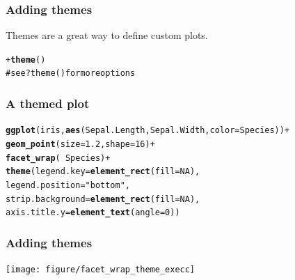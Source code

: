 \documentclass{beamer}\usepackage{graphicx, color}
\makeatletter
\newcommand{\hlfunctioncall}[1]{\textcolor[rgb]{0.501960784313725,0,0.329411764705882}{\textbf{#1}}}%
\newcommand{\hlstring}[1]{\textcolor[rgb]{0.6,0.6,1}{#1}}%
\newcommand{\hlcomment}[1]{\textcolor[rgb]{0.180392156862745,0.6,0.341176470588235}{#1}}%
\newenvironment{kframe}{%
 \def\at@end@of@kframe{}%
 \ifinner\ifhmode%
  \def\at@end@of@kframe{\end{minipage}}%
  \begin{minipage}{\columnwidth}%
 \fi\fi%
 \def\FrameCommand##1{\hskip\@totalleftmargin \hskip-\fboxsep
 \colorbox{shadecolor}{##1}\hskip-\fboxsep
     \hskip-\linewidth \hskip-\@totalleftmargin \hskip\columnwidth}%
 \MakeFramed {\advance\hsize-\width
   \@totalleftmargin\z@ \linewidth\hsize
   \@setminipage}}%
 {\par\unskip\endMakeFramed%
 \at@end@of@kframe}
\newenvironment{knitrout}{}{} %
\makeatother
\begin{document}
\begin{frame}[fragile]
\frametitle{Adding themes}
Themes are a great way to define custom plots.
\begin{knitrout}\footnotesize
{}\color{fgcolor}\begin{kframe}
\begin{alltt}
+\hlfunctioncall{theme}()
\hlcomment{# see ?theme() for more options}
\end{alltt}
\end{kframe}
\end{knitrout}


\end{frame}


\begin{frame}[fragile]
\frametitle{A themed plot}
\begin{knitrout}\footnotesize
{}\color{fgcolor}\begin{kframe}
\begin{alltt}
\hlfunctioncall{ggplot}(iris, \hlfunctioncall{aes}(Sepal.Length, Sepal.Width, color = Species)) +
\hlfunctioncall{geom_point}(size = 1.2, shape = 16) +
\hlfunctioncall{facet_wrap}( ~ Species) +
\hlfunctioncall{theme}(legend.key = \hlfunctioncall{element_rect}(fill = NA),
legend.position = \hlstring{"bottom"},
strip.background = \hlfunctioncall{element_rect}(fill = NA),
axis.title.y = \hlfunctioncall{element_text}(angle = 0))
\end{alltt}
\end{kframe}
\end{knitrout}

\end{frame}

\begin{frame}[fragile]
\frametitle{Adding themes}
\begin{knitrout}\footnotesize
{}\color{fgcolor}
\texttt{[image: figure/facet\_wrap\_theme\_execc]} 

\end{knitrout}

\end{frame}
\end{document}
